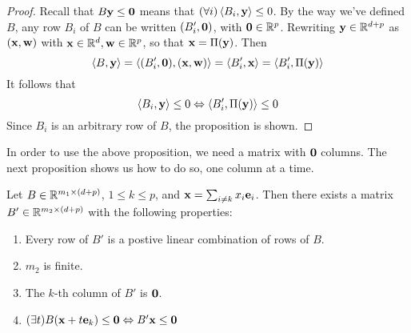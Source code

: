 \begin{proof}
  Recall that $B\mathbf{y} \leq \mathbf{0}$ means that $(\forall i)\left\langle B_i, \mathbf{y} \right\rangle \leq 0$.  By the way we've defined $B$, any row $B_i$ of $B$ can be written $(B'_i,\mathbf{0})$, with $\mathbf{0} \in \mathbb{R}^p$.  Rewriting $\mathbf{y}\in\mathbb{R}^{d+p}$ as $(\mathbf{x},\mathbf{w})$ with $\mathbf{x}\in\mathbb{R}^d,\mathbf{w}\in\mathbb{R}^p$, so that $\mathbf{x} = \Pi(\mathbf{y})$.  Then
  \[ \left\langle B, \mathbf{y} \right\rangle = \left\langle (B'_i,\mathbf{0}), (\mathbf{x},\mathbf{w}) \right\rangle = \left\langle B'_i, \mathbf{x} \right\rangle = \left\langle B'_i, \Pi(\mathbf{y}) \right\rangle \]
  It follows that
  \[ \left\langle B_i, \mathbf{y} \right\rangle \leq 0 \Leftrightarrow \left\langle B'_i, \Pi(\mathbf{y}) \right\rangle \leq 0 \]
  Since $B_i$ is an arbitrary row of $B$, the proposition is shown.
\end{proof}

In order to use the above proposition, we need a matrix with $\mathbf{0}$ columns.  The next proposition shows us how to do so, one column at a time.

\begin{Prop}{\label{prop:hconeproj}
Let $B \in \mathbb{R}^{m_1\times (d+p)}$, $1 \leq k \leq p$, and $\mathbf{x} = \sum_{i\neq k}x_i \mathbf{e}_i$.  Then there exists a matrix $B' \in \mathbb{R}^{m_2\times (d+p)}$ with the following properties:
  \begin{enumerate}
    \item Every row of $B'$ is a postive linear combination of rows of $B$.
    \item $m_2$ is finite.
    \item The $k$-th column of $B'$ is $\mathbf{0}$.
    \item \((\exists t)B(\mathbf{x} + t\mathbf{e}_k) \leq \mathbf{0} \Leftrightarrow B'\mathbf{x} \leq \mathbf{0}\)
  \end{enumerate}
}\end{Prop}
